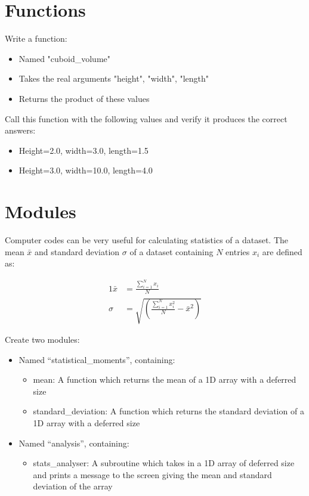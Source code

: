 \documentclass[11pt,a4paper]{article}
\begin{document}
\section{Functions}
Write a function:
\begin{itemize}
    \item Named "cuboid\_volume"
    \item Takes the real arguments "height", "width", "length"
    \item Returns the product of these values
\end {itemize}
Call this function with the following values and verify it produces the correct answers:
\begin{itemize}
    \item Height=2.0, width=3.0, length=1.5
    \item Height=3.0, width=10.0, length=4.0
\end {itemize}

\section{Modules}
Computer codes can be very useful for calculating statistics of a dataset. The mean $\bar{x}$ and standard deviation $\sigma$ of a dataset containing $N$ entries $x_{i}$ are defined as:

\begin{alignat}{1}
    \bar{x} & = \frac{\sum\limits_{i=1}^{N} x_{i}}{N} \\
    \sigma &= \sqrt{\left(\frac{\sum\limits_{i=1}^{N} x_{i}^{2}}{N}-\bar{x}^{2}\right)}
\end{alignat}

Create two modules:
\begin{itemize}
    \item Named ``statistical\_moments'', containing:
    \begin{itemize}
        \item mean: A function which returns the mean of a 1D array with a deferred size
        \item standard\_deviation: A function which returns the standard deviation of a 1D array with a deferred size
    \end{itemize}
    \item Named ``analysis'', containing:
    \begin{itemize}
        \item stats\_analyser: A subroutine which takes in a 1D array of deferred size and prints a message to the screen giving the mean and standard deviation of the array
    \end{itemize}
\end{itemize}
\end{document}
